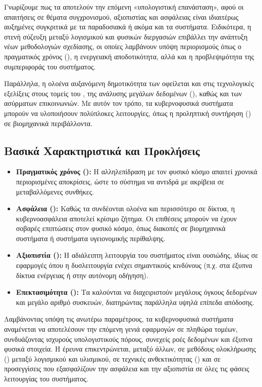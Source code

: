 Γνωρίζουμε πως τα  αποτελούν την επόμενη
«υπολογιστική επανάσταση»,\cite{Rajkumar2010}\cite{Rajkumar2010} αφού οι απαιτήσεις σε θέματα συγχρονισμού, αξιοπιστίας και
ασφάλειας είναι ιδιαιτέρως αυξημένες συγκριτικά με τα παραδοσιακά  ή ακόμα και τα
 συστήματα. Ειδικότερα, η στενή σύζευξη μεταξύ λογισμικού και φυσικών διεργασιών
επιβάλλει την ανάπτυξη νέων μεθοδολογιών σχεδίασης, οι οποίες λαμβάνουν υπόψη περιορισμούς
όπως ο πραγματικός χρόνος (), η ενεργειακή αποδοτικότητα, αλλά και η
προβλεψιμότητα της συμπεριφοράς του συστήματος.

Παράλληλα, η ολοένα αυξανόμενη
δημοτικότητα των  οφείλεται και στις τεχνολογικές εξελίξεις στους τομείς του
 \cite{Baheti2011}, της ανάλυσης μεγάλων δεδομένων (), καθώς και των
ασύρματων επικοινωνιών. Με αυτόν τον τρόπο, τα κυβερνοφυσικά συστήματα μπορούν να
υλοποιήσουν πολύπλοκες λειτουργίες, όπως η προληπτική συντήρηση ()
σε βιομηχανικά περιβάλλοντα.

\subsection{Βασικά Χαρακτηριστικά και Προκλήσεις}

\begin{itemize}
  \item \textbf{Πραγματικός χρόνος ():} Η αλληλεπίδραση με τον φυσικό κόσμο
    απαιτεί χρονικά περιορισμένες αποκρίσεις, ώστε το σύστημα να αντιδρά με ακρίβεια σε
    μεταβαλλόμενες συνθήκες.
  \item \textbf{Ασφάλεια ():} Καθώς τα  συνδέονται ολοένα και περισσότερο
    σε δίκτυα, η κυβερνοασφάλεια αποτελεί κρίσιμο ζήτημα. Οι επιθέσεις μπορούν να έχουν
    σοβαρές επιπτώσεις στον φυσικό κόσμο, όπως διακοπές σε βιομηχανικά συστήματα ή
    συστήματα υγειονομικής περίθαλψης.
  \item \textbf{Αξιοπιστία ():} Η αδιάλειπτη λειτουργία του συστήματος
    είναι ουσιώδης, ιδίως σε εφαρμογές όπου η δυσλειτουργία ενέχει σημαντικούς κινδύνους
    (π.χ. στα έξυπνα δίκτυα ενέργειας ή στην αυτόνομη οδήγηση).
  \item \textbf{Επεκτασιμότητα ():} Τα  καλούνται να διαχειριστούν
    μεγάλους όγκους δεδομένων και μεγάλο αριθμό συσκευών, διατηρώντας παράλληλα υψηλά
    επίπεδα απόδοσης.
\end{itemize}

Λαμβάνοντας υπόψη τις ανωτέρω παραμέτρους, τα κυβερνοφυσικά συστήματα αναμένεται να
αποτελέσουν την επόμενη γενιά εφαρμογών σε πληθώρα τομέων, συνδυάζοντας ισχυρούς
υπολογιστικούς πόρους, συνεχείς ροές δεδομένων και έξυπνα φυσικά στοιχεία. Η έρευνα
επικεντρώνεται, μεταξύ άλλων, σε μεθόδους ολοκλήρωσης () μεταξύ λογισμικού
και υλισμικού, σε τεχνικές ανθεκτικότητας () και σε προσεγγίσεις που
εξασφαλίζουν την ασφάλεια και την αξιοπιστία σε όλες τις φάσεις λειτουργίας του συστήματος.


